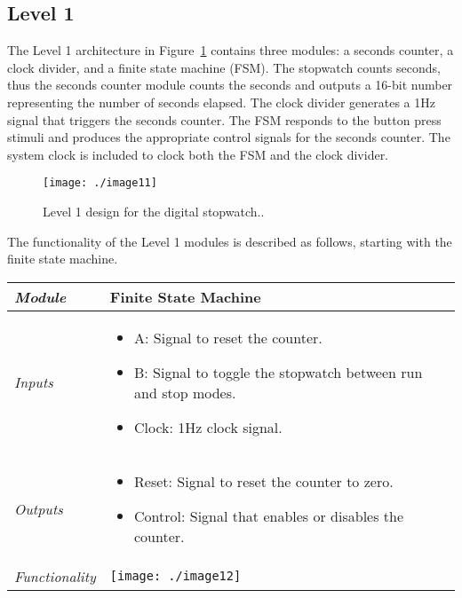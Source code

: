 \subsection*{Level 1}
\label{subsection:level-1-1}
The Level 1 architecture in Figure~\ref{figure:level1Stopwatch}
contains three modules: a seconds
counter, a clock divider, and a finite state machine (FSM). The
stopwatch counts seconds, thus the seconds counter module counts the
seconds and outputs a 16-bit number representing the number of seconds
elapsed. The clock divider generates a 1Hz signal that triggers the
seconds counter. The FSM responds to the button press stimuli and
produces the appropriate control signals for the seconds counter. The
system clock is included to clock both the FSM and the clock divider.

\begin{figure}
\texttt{[image: ./image11]}
\caption{Level 1 design for the digital stopwatch..}
\label{figure:level1Stopwatch}
\end{figure}

The functionality of the Level 1 modules is described as follows,
starting with the finite state machine.

\begin{table}
\label{table:level1HighGainAmp}
\begin{tabular}{|l|m{10cm}|}
\hline
\emph{Module} & Finite State Machine \\ \hline
\emph{Inputs} & 
\begin{itemize}
\item
  A: Signal to reset the counter.
\item
  B: Signal to toggle the stopwatch between run and stop modes.
\item
  Clock: 1Hz clock signal.
\end{itemize}\\ \hline

\emph{Outputs} & 
\begin{itemize}
\item
  Reset: Signal to reset the counter to zero.
\item
  Control: Signal that enables or disables the counter.
\end{itemize} \\ \hline
\emph{Functionality} &
\texttt{[image: ./image12]} \\ \hline
\end{tabular}
\end{table}

